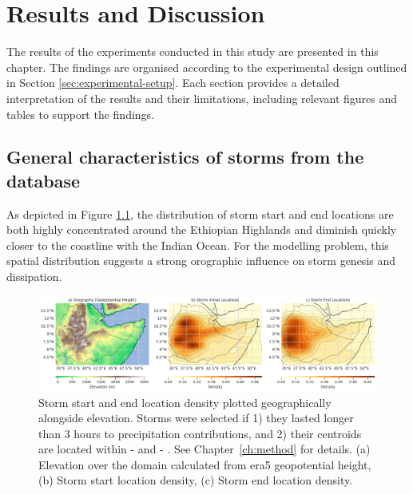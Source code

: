 \chapter{Results and Discussion}
\label{ch:results}

The results of the experiments conducted in this study are presented in this chapter. The findings are organised according to the experimental design outlined in Section \ref{sec:experimental-setup}. Each section provides a detailed interpretation of the results and their limitations, including relevant figures and tables to support the findings.

\section{General characteristics of storms from the database}

As depicted in Figure \ref{fig:orography_storm_init_end_kde}, the distribution of storm start and end locations are both highly concentrated around the Ethiopian Highlands and diminish quickly closer to the coastline with the Indian Ocean. For the modelling problem, this spatial distribution suggests a strong orographic influence on storm genesis and dissipation.

\begin{figure}[ht]
    \centering
    \includegraphics[width=\textwidth]{../figures/generated/exploration/orography_storm_init_end_kde.png}
    \caption{Storm start and end location density plotted geographically alongside elevation. Storms were selected if 1) they lasted longer than 3 hours to precipitation contributions, and 2) their centroids are located within  -  and  -  \citep{Hill2023}. See Chapter~\ref{ch:method} for details. (a) Elevation over the domain calculated from \acrshort{era5} geopotential height, (b) Storm start location density, (c) Storm end location density.}
    \label{fig:orography_storm_init_end_kde}
\end{figure}

